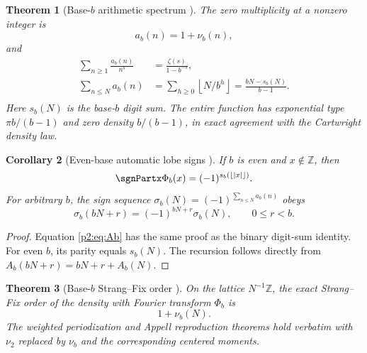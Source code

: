 \documentclass[11pt]{article}
\numberwithin{equation}{section}
\newtheorem{theorem}{Theorem}[section]
\newtheorem{corollary}[theorem]{Corollary}
\theoremstyle{definition}
\theoremstyle{remark}
\newcommand{\Z}{\mathbb Z}
\newcommand{\floor}[1]{\left\lfloor#1\right\rfloor}
\begin{document}
\begin{theorem}[Base-$b$ arithmetic spectrum \NewResult]
\label{p2:thm:baseb}
The zero multiplicity at a nonzero integer is
\begin{equation}
 a_b(n)=1+\nu_b(n),                                       \label{p2:eq:ab}
\end{equation}
and
\begin{align}
 \sum_{n\ge1}\frac{a_b(n)}{n^s}
   &=\frac{\zeta(s)}{1-b^{-s}},                           \label{p2:eq:Db}\\
 \sum_{n\le N}a_b(n)
   &=\sum_{h\ge0}\floor{N/b^h}
     =\frac{bN-s_b(N)}{b-1}.                              \label{p2:eq:Ab}\\
\end{align}
Here $s_b(N)$ is the base-$b$ digit sum.  The entire function has exponential
type $\pi b/(b-1)$ and zero density $b/(b-1)$, in exact agreement with the
Cartwright density law.
\end{theorem}

\begin{corollary}[Even-base automatic lobe signs \NewResult]
If $b$ is even and $x\notin\Z$, then
\begin{equation}
 \sgnPartx\Phi_b(x)=(-1)^{s_b(\floor{|x|})}.                   \label{p2:eq:baseb-sign}
\end{equation}
For arbitrary $b$, the sign sequence
$\sigma_b(N)=(-1)^{\sum_{n\le N}a_b(n)}$ obeys
\begin{equation}
 \sigma_b(bN+r)=(-1)^{bN+r}\sigma_b(N),
 \qquad 0\le r<b.                                         \label{p2:eq:sigmab-rec}
\end{equation}
\end{corollary}

\begin{proof}
Equation \eqref{p2:eq:Ab} has the same proof as the binary digit-sum identity.
For even $b$, its parity equals $s_b(N)$.  The recursion follows directly from
$A_b(bN+r)=bN+r+A_b(N)$.
\end{proof}

\begin{theorem}[Base-$b$ Strang--Fix order \NewResult]
On the lattice $N^{-1}\Z$, the exact Strang--Fix order of the density with
Fourier transform $\Phi_b$ is
\begin{equation}
 1+\nu_b(N).                                               \label{p2:eq:SFb}
\end{equation}
The weighted periodization and Appell reproduction theorems hold verbatim with
$\nu_2$ replaced by $\nu_b$ and the corresponding centered moments.
\end{theorem}
\end{document}
